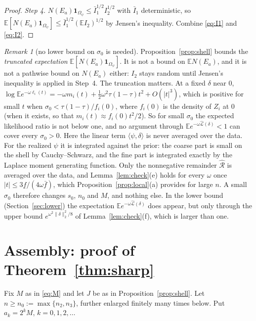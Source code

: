 \documentclass[11pt]{article}
\theoremstyle{definition}
\theoremstyle{remark}
\newtheorem{remark}{Remark}
\newcommand{\E}{\mathbb{E}}
\newcommand{\om}{\omega}
\newcommand{\Lh}{\widehat{\mathcal L}}
\newcommand{\Rh}{\widehat{\mathcal R}}
\newcommand{\fl}{\underline f}
\newcommand{\fu}{\bar f}
\newcommand{\ind}{\mathbf 1}
\begin{document}
\begin{proof}
\emph{Step 4.} $N(E_a)\ind_{\Omega_\psi}\le\bar I_1^{1/2}I_2^{1/2}$ with $\bar I_1$ deterministic, so $\E[N(E_a)\ind_{\Omega_\psi}]\le\bar I_1^{1/2}(\E I_2)^{1/2}$ by Jensen's inequality. Combine \eqref{eq:I1} and \eqref{eq:I2}.
\end{proof}

\begin{remark}[no lower bound on $\sigma_0$ is needed]\label{rem:sigma}
Proposition~\ref{prop:shell} bounds the \emph{truncated expectation} $\E[N(E_a)\ind_{\Omega_\psi}]$. It is not a bound on $\E N(E_a)$, and it is not a pathwise bound on $N(E_a)$ either: $I_2$ stays random until Jensen's inequality is applied in Step~4. The truncation matters. At a fixed $\delta$ near $0$,
$\log\E e^{-\om\ell_i(t)}=-\om m_i(t)+\tfrac12\om^2\tau(1-\tau)t^2+O(|t|^3)$, which is positive for small $t$ when $\sigma_0<\tau(1-\tau)/f_i(0)$, where $f_i(0)$ is the density of $Z_i$ at $0$ (when it exists, so that $m_i(t)\approx f_i(0)t^2/2$). So for small $\sigma_0$ the expected likelihood ratio is not below one, and no argument through $\E e^{-\om\Lh(\delta)}<1$ can cover every $\sigma_0>0$. Here the linear term $\langle\psi,\delta\rangle$ is never averaged over the data. For the realized $\psi$ it is integrated against the prior: the coarse part is small on the shell by Cauchy--Schwarz, and the fine part is integrated exactly by the Laplace moment generating function. Only the nonnegative remainder $\Rh$ is averaged over the data, and Lemma~\ref{lem:check}(e) holds for every $\om$ once $|t|\le3\fl/(4\om\fu)$, which Proposition~\ref{prop:local}(a) provides for large $n$. A small $\sigma_0$ therefore changes $s_0$, $n_0$ and $M$, and nothing else. In the lower bound (Section~\ref{sec:lower}) the expectation $\E e^{-\om\Lh(\delta)}$ does appear, but only through the upper bound $e^{\om^2\|\delta\|_2^2/8}$ of Lemma~\ref{lem:check}(f), which is larger than one.
\end{remark}

\section{Assembly: proof of Theorem~\ref{thm:sharp}}\label{sec:assembly}

Fix $M$ as in \eqref{eq:M} and let $J$ be as in Proposition~\ref{prop:shell}. Let $n\ge n_0:=\max\{n_2,n_3\}$, further enlarged finitely many times below. Put $a_k=2^kM$, $k=0,1,2,\dots$
\end{document}
